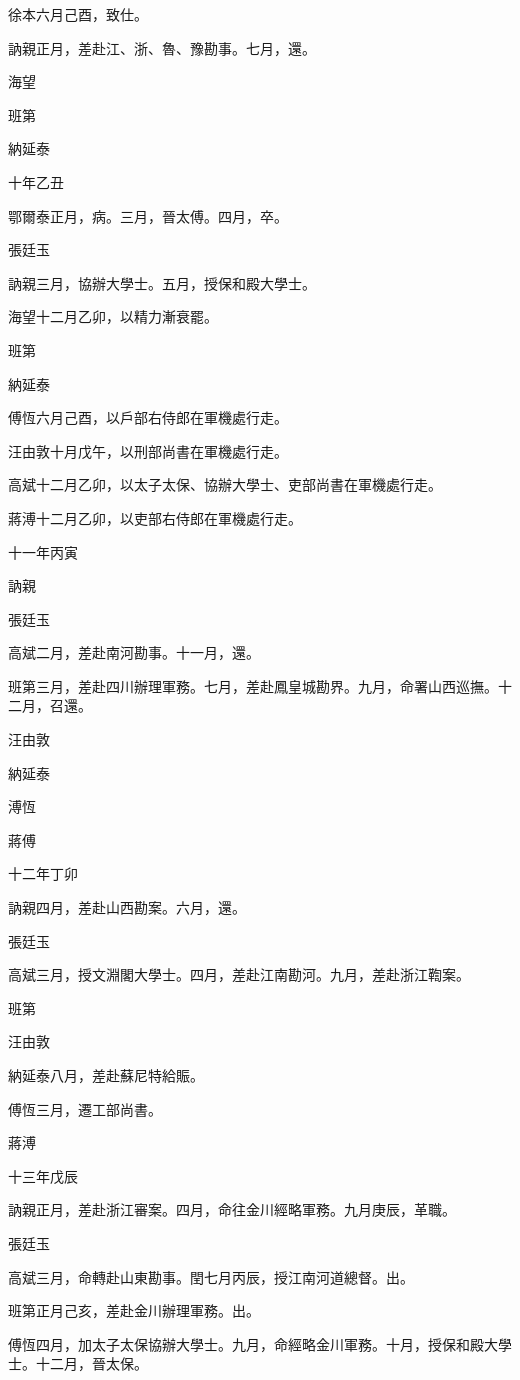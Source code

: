 \begin{pinyinscope}
徐本六月己酉，致仕。

訥親正月，差赴江、浙、魯、豫勘事。七月，還。

海望

班第

納延泰

十年乙丑

鄂爾泰正月，病。三月，晉太傅。四月，卒。

張廷玉

訥親三月，協辦大學士。五月，授保和殿大學士。

海望十二月乙卯，以精力漸衰罷。

班第

納延泰

傅恆六月己酉，以戶部右侍郎在軍機處行走。

汪由敦十月戊午，以刑部尚書在軍機處行走。

高斌十二月乙卯，以太子太保、協辦大學士、吏部尚書在軍機處行走。

蔣溥十二月乙卯，以吏部右侍郎在軍機處行走。

十一年丙寅

訥親

張廷玉

高斌二月，差赴南河勘事。十一月，還。

班第三月，差赴四川辦理軍務。七月，差赴鳳皇城勘界。九月，命署山西巡撫。十二月，召還。

汪由敦

納延泰

溥恆

蔣傅

十二年丁卯

訥親四月，差赴山西勘案。六月，還。

張廷玉

高斌三月，授文淵閣大學士。四月，差赴江南勘河。九月，差赴浙江鞫案。

班第

汪由敦

納延泰八月，差赴蘇尼特給賑。

傅恆三月，遷工部尚書。

蔣溥

十三年戊辰

訥親正月，差赴浙江審案。四月，命往金川經略軍務。九月庚辰，革職。

張廷玉

高斌三月，命轉赴山東勘事。閏七月丙辰，授江南河道總督。出。

班第正月己亥，差赴金川辦理軍務。出。

傅恆四月，加太子太保協辦大學士。九月，命經略金川軍務。十月，授保和殿大學士。十二月，晉太保。


\end{pinyinscope}
